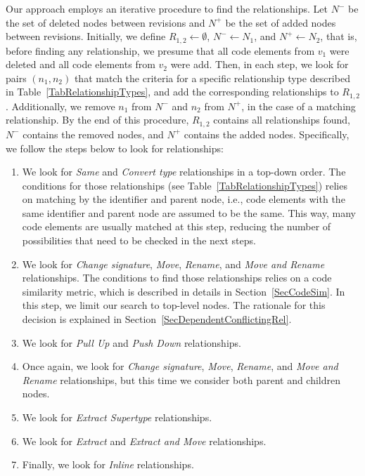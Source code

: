 Our approach employs an iterative procedure to find the relationships.
Let $N^-$ be the set of deleted nodes between revisions and $N^+$ be the set of added nodes between revisions.
Initially, we define $R_{1,2} \gets \emptyset$, $N^- \gets N_1$, and $N^+ \gets N_2$, that is, before finding any relationship, we presume that all code elements from $v_1$ were deleted and  all code elements from $v_2$ were add.
Then, in each step, we look for pairs $(n_1, n_2)$ that match the criteria for a specific relationship type described in Table~\ref{TabRelationshipTypes}, and add the corresponding relationships to $R_{1,2}$.
Additionally, we remove $n_1$ from $N^-$ and $n_2$ from $N^+$, in the case of a matching relationship.
By the end of this procedure, $R_{1,2}$ contains all relationships found, $N^-$ contains the removed nodes, and $N^+$ contains the added nodes.
Specifically, we follow the steps below to look for relationships:
\begin{enumerate}

\item We look for \textit{Same} and \textit{Convert type} relationships in a top-down order. The conditions for those relationships (see Table~\ref{TabRelationshipTypes}) relies on matching by the identifier and parent node, i.e., code elements with the same identifier and parent node are assumed to be the same.
This way, many code elements are usually matched at this step, reducing the number of possibilities that need to be checked in the next steps.

\item We look for \textit{Change signature}, \textit{Move}, \textit{Rename}, and \textit{Move and Rename} relationships.
The conditions to find those relationships relies on a code similarity metric, which is described in details in Section~\ref{SecCodeSim}.
In this step, we limit our search to top-level nodes.
The rationale for this decision is explained in Section~\ref{SecDependentConflictingRel}.

\item We look for \textit{Pull Up} and \textit{Push Down} relationships.

\item Once again, we look for \textit{Change signature}, \textit{Move}, \textit{Rename}, and \textit{Move and Rename} relationships, but this time we consider both parent and children nodes.

\item We look for \textit{Extract Supertype} relationships.

\item We look for \textit{Extract} and \textit{Extract and Move} relationships.

\item Finally, we look for \textit{Inline} relationships.

\end{enumerate}


